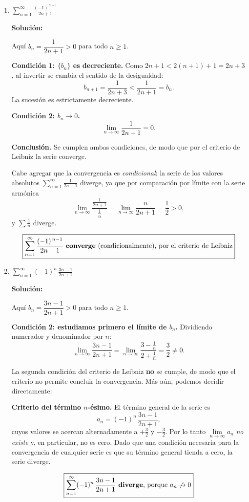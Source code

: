 \documentclass[12pt]{article}
\newcommand{\solucion}{%
    \vspace{0.8em}%
    \textbf{Solución:}%
}
\begin{document}
\begin{enumerate}[label=\alph*.-]

    \item $\displaystyle\sum_{n=1}^{\infty}\frac{(-1)^{\,n-1}}{2n+1}$

    \solucion

    Aquí $b_n=\dfrac{1}{2n+1}>0$ para todo $n\ge 1$.

    \textbf{Condición 1: $\{b_n\}$ es decreciente.} Como $2n+1<2(n+1)+1=2n+3$,
    al invertir se cambia el sentido de la desigualdad:
    \[
    b_{n+1}=\frac{1}{2n+3}<\frac{1}{2n+1}=b_n .
    \]
    La sucesión es estrictamente decreciente.

    \textbf{Condición 2: $b_n\to 0$.}
    \[
    \lim_{n\to\infty}\frac{1}{2n+1}=0 .
    \]

    \textbf{Conclusión.} Se cumplen ambas condiciones, de modo que por el
    criterio de Leibniz la serie converge.

    Cabe agregar que la convergencia es \emph{condicional}: la serie de los
    valores absolutos $\displaystyle\sum_{n=1}^{\infty}\frac{1}{2n+1}$ diverge,
    ya que por comparación por límite con la serie armónica
    \[
    \lim_{n\to\infty}\frac{\frac{1}{2n+1}}{\frac1n}
    =\lim_{n\to\infty}\frac{n}{2n+1}=\frac12>0 ,
    \]
    y $\sum\frac1n$ diverge.

    \[
    \boxed{
    \sum_{n=1}^{\infty}\frac{(-1)^{\,n-1}}{2n+1}
    \text{ \textbf{converge} (condicionalmente), por el criterio de Leibniz}
    }
    \]

    \item $\displaystyle\sum_{n=1}^{\infty}(-1)^{n}\,\frac{3n-1}{2n+1}$

    \solucion

    Aquí $b_n=\dfrac{3n-1}{2n+1}>0$ para todo $n\ge 1$.

    \textbf{Condición 2: estudiamos primero el límite de $b_n$.} Dividiendo
    numerador y denominador por $n$:
    \[
    \lim_{n\to\infty}\frac{3n-1}{2n+1}
    =\lim_{n\to\infty}\frac{3-\frac1n}{2+\frac1n}
    =\frac{3}{2}\neq 0 .
    \]

    La segunda condición del criterio de Leibniz \textbf{no} se cumple, de modo
    que el criterio no permite concluir la convergencia. Más aún, podemos
    decidir directamente:

    \textbf{Criterio del término $n$-ésimo.} El término general de la serie es
    \[
    a_n=(-1)^{n}\,\frac{3n-1}{2n+1},
    \]
    cuyos valores se acercan alternadamente a $+\frac32$ y $-\frac32$. Por lo
    tanto $\lim\limits_{n\to\infty}a_n$ \emph{no existe} y, en particular, no es
    cero. Dado que una condición necesaria para la convergencia de cualquier
    serie es que su término general tienda a cero, la serie diverge.

    \[
    \boxed{
    \sum_{n=1}^{\infty}(-1)^{n}\,\frac{3n-1}{2n+1}
    \text{ \textbf{diverge}, porque } a_n\not\to 0
    }
    \]

\end{enumerate}
\end{document}
